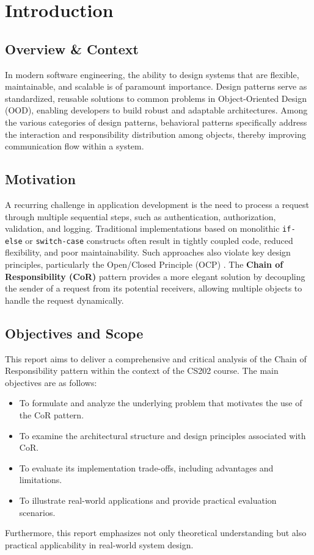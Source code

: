 \section{Introduction}

\subsection{Overview \& Context}
In modern software engineering, the ability to design systems that are flexible, maintainable, and scalable is of paramount importance. Design patterns serve as standardized, reusable solutions to common problems in Object-Oriented Design (OOD), enabling developers to build robust and adaptable architectures. Among the various categories of design patterns, behavioral patterns specifically address the interaction and responsibility distribution among objects, thereby improving communication flow within a system.

\subsection{Motivation}
A recurring challenge in application development is the need to process a request through multiple sequential steps, such as authentication, authorization, validation, and logging. Traditional implementations based on monolithic \texttt{if-else} or \texttt{switch-case} constructs often result in tightly coupled code, reduced flexibility, and poor maintainability. Such approaches also violate key design principles, particularly the Open/Closed Principle (OCP) \cite{martin2000design}. The \textbf{Chain of Responsibility (CoR)} pattern \cite{gof1994} provides a more elegant solution by decoupling the sender of a request from its potential receivers, allowing multiple objects to handle the request dynamically.

\subsection{Objectives and Scope}
This report aims to deliver a comprehensive and critical analysis of the Chain of Responsibility pattern within the context of the CS202 course. The main objectives are as follows:
\begin{itemize}
    \item To formulate and analyze the underlying problem that motivates the use of the CoR pattern.
    \item To examine the architectural structure and design principles associated with CoR.
    \item To evaluate its implementation trade-offs, including advantages and limitations.
    \item To illustrate real-world applications and provide practical evaluation scenarios.
\end{itemize}
Furthermore, this report emphasizes not only theoretical understanding but also practical applicability in real-world system design.

